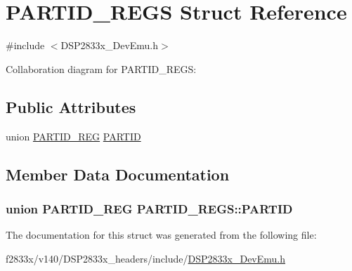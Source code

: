 \hypertarget{struct_p_a_r_t_i_d___r_e_g_s}{}\section{P\+A\+R\+T\+I\+D\+\_\+\+R\+E\+G\+S Struct Reference}
\label{struct_p_a_r_t_i_d___r_e_g_s}


{\ttfamily \#include $<$D\+S\+P2833x\+\_\+\+Dev\+Emu.\+h$>$}



Collaboration diagram for P\+A\+R\+T\+I\+D\+\_\+\+R\+E\+G\+S\+:
\subsection*{Public Attributes}
\begin{DoxyCompactItemize}
\item 
union \hyperlink{union_p_a_r_t_i_d___r_e_g}{P\+A\+R\+T\+I\+D\+\_\+\+R\+E\+G} \hyperlink{struct_p_a_r_t_i_d___r_e_g_s_a853a13509e25954cd904039ec17aea15}{P\+A\+R\+T\+I\+D}
\end{DoxyCompactItemize}


\subsection{Member Data Documentation}
\hypertarget{struct_p_a_r_t_i_d___r_e_g_s_a853a13509e25954cd904039ec17aea15}{}
\subsubsection[{P\+A\+R\+T\+I\+D}]{\setlength{\rightskip}{0pt plus 5cm}union {\bf P\+A\+R\+T\+I\+D\+\_\+\+R\+E\+G} P\+A\+R\+T\+I\+D\+\_\+\+R\+E\+G\+S\+::\+P\+A\+R\+T\+I\+D}\label{struct_p_a_r_t_i_d___r_e_g_s_a853a13509e25954cd904039ec17aea15}


The documentation for this struct was generated from the following file\+:\begin{DoxyCompactItemize}
\item 
f2833x/v140/\+D\+S\+P2833x\+\_\+headers/include/\hyperlink{_d_s_p2833x___dev_emu_8h}{D\+S\+P2833x\+\_\+\+Dev\+Emu.\+h}\end{DoxyCompactItemize}
